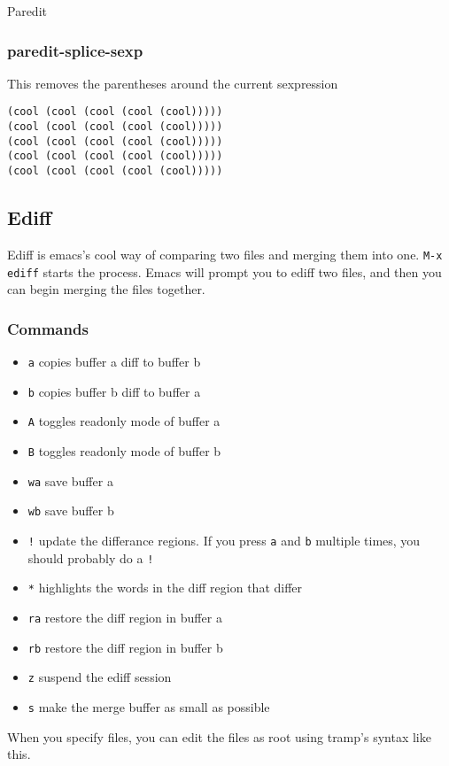 \documentclass[11pt]{article}
\begin{document}
Paredit

\subsubsection{paredit-splice-sexp}
\label{sec:orgheadline32}
This removes the parentheses around the current sexpression
\begin{verbatim}
(cool (cool (cool (cool (cool)))))
(cool (cool (cool (cool (cool)))))
(cool (cool (cool (cool (cool)))))
(cool (cool (cool (cool (cool)))))
(cool (cool (cool (cool (cool)))))
\end{verbatim}
\subsection{Ediff}
\label{sec:orgheadline35}
Ediff is emacs's cool way of comparing two files and merging them into one.  \texttt{M-x ediff} starts the process.  Emacs will prompt you to ediff two files, and then you can begin merging the files together.
\subsubsection{Commands}
\label{sec:orgheadline34}
\begin{itemize}
\item \texttt{a} copies buffer a diff to buffer b
\item \texttt{b} copies buffer b diff to buffer a
\item \texttt{A} toggles readonly mode of buffer a
\item \texttt{B} toggles readonly mode of buffer b
\item \texttt{wa} save buffer a
\item \texttt{wb} save buffer b
\item \texttt{!} update the differance regions.  If you press \texttt{a} and \texttt{b} multiple times, you should probably do a \texttt{!}
\item \texttt{*} highlights the words in the diff region that differ
\item \texttt{ra} restore the diff region in buffer a
\item \texttt{rb} restore the diff region in buffer b
\item \texttt{z} suspend the ediff session
\item \texttt{s} make the merge buffer as small as possible
\end{itemize}

When you specify files, you can edit the files as root using tramp's syntax like this.
\end{document}
